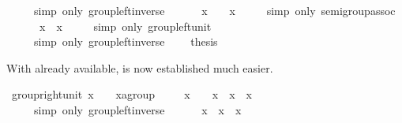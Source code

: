 \begin{isabellebody}
\ \ \ \ \ {\isacharparenleft}simp\ only{\isacharcolon}\ group{\isachardot}left{\isacharunderscore}inverse{\isacharparenright}\isanewline
\ \ \ \ {\isachardoublequote}{\isachardot}{\isachardot}{\isachardot}\ {\isacharequal}\ {\isacharparenleft}x{\isasyminv}{\isacharparenright}{\isasyminv}\ {\isasymodot}\ {\isacharparenleft}{\isasymunit}\ {\isasymodot}\ x{\isasyminv}{\isacharparenright}{\isachardoublequote}\isanewline
\ \ \ \ \ {\isacharparenleft}simp\ only{\isacharcolon}\ semigroup{\isachardot}assoc{\isacharparenright}\isanewline
\ \ \ \ {\isachardoublequote}{\isachardot}{\isachardot}{\isachardot}\ {\isacharequal}\ {\isacharparenleft}x{\isasyminv}{\isacharparenright}{\isasyminv}\ {\isasymodot}\ x{\isasyminv}{\isachardoublequote}\isanewline
\ \ \ \ \ {\isacharparenleft}simp\ only{\isacharcolon}\ group{\isachardot}left{\isacharunderscore}unit{\isacharparenright}\isanewline
\ \ \ \ {\isachardoublequote}{\isachardot}{\isachardot}{\isachardot}\ {\isacharequal}\ {\isasymunit}{\isachardoublequote}\isanewline
\ \ \ \ \ {\isacharparenleft}simp\ only{\isacharcolon}\ group{\isachardot}left{\isacharunderscore}inverse{\isacharparenright}\isanewline
\ \ \ \ {\isacharquery}thesis\ \isacommand{{\isachardot}}\isanewline
{}%
\begin{isamarkuptext}%
\noindent With  already available, \label{thm:group-right-unit} is now established much
 easier.%
\end{isamarkuptext}%
\ group{\isacharunderscore}right{\isacharunderscore}unit{\isacharcolon}\ {\isachardoublequote}x\ {\isasymodot}\ {\isasymunit}\ {\isacharequal}\ {\isacharparenleft}x{\isasymColon}{\isacharprime}a{\isasymColon}group{\isacharparenright}{\isachardoublequote}\isanewline
{}\ {\isacharminus}\isanewline
\ \ \ {\isachardoublequote}x\ {\isasymodot}\ {\isasymunit}\ {\isacharequal}\ x\ {\isasymodot}\ {\isacharparenleft}x{\isasyminv}\ {\isasymodot}\ x{\isacharparenright}{\isachardoublequote}\isanewline
\ \ \ \ \ {\isacharparenleft}simp\ only{\isacharcolon}\ group{\isachardot}left{\isacharunderscore}inverse{\isacharparenright}\isanewline
\ \ \ \ {\isachardoublequote}{\isachardot}{\isachardot}{\isachardot}\ {\isacharequal}\ x\ {\isasymodot}\ x{\isasyminv}\ {\isasymodot}\ x{\isachardoublequote}\isanewline

\end{isabellebody}
